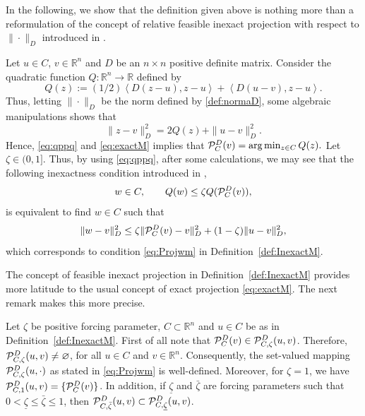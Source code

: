 In the following, we show that the definition given above is nothing more than a reformulation of the concept of  relative feasible inexact projection with respect to $\| \cdot \|_{D}$  introduced in  \cite{BirginMartinezRaydan2003}.
\begin{remark}\normalfont
	Let $u\in C$, $v\in \mathbb{R}^n$ and  $D$ be   an $n\times n$ positive definite matrix. Consider the quadratic  function $Q: \mathbb{R}^n \to \mathbb{R}$ defined by
	$$
		Q(z):=(1/2) \left\langle {D}(z-u),z-u\right\rangle +  \left \langle D(u-v), z-u \right\rangle.
	$$
	Thus,  letting  $\| \cdot \|_{D}$  be  the norm  defined by \eqref{def:normaD},  some algebraic manipulations   shows that
	\begin{equation} \label{eq:qppq}
		\|z-v\|^2_{D}= 2Q(z) +\|u-v\|^2_{D}.
	\end{equation}
	Hence,  \eqref{eq:qppq}  and \eqref{eq:exactM}  implies  that    ${\cal P}_{C}^{D}(v)=\arg \min _{z\in C}Q(z).$
	Let $\zeta\in (0, 1]$. Thus, by using \eqref{eq:qppq},  after some calculations,  we may see that  the following inexactness condition  introduced in \cite{BirginMartinezRaydan2003},
	$$
		w\in C, \qquad Q(w)\leq \zeta Q ( {\cal P}_{C}^{D}(v)) ,
	$$
	is  equivalent to find  $w\in C$ such that
	$$
		\|w-v\|_{D}^2\leq \zeta \| {\cal P}_{C}^{D}(v)-v\|_{D}^2+(1-\zeta)\|u-v\|_{D}^2,
	$$
	which corresponds to condition \eqref{eq:Projwm} in Definition~\ref{def:InexactM}.
\end{remark}\normalfont
The  concept of  feasible inexact projection  in Definition~\ref{def:InexactM}  provides  more latitude to   the usual  concept  of exact projection \eqref{eq:exactM}.  The next   remark makes  this more precise.
\begin{remark}\normalfont\label{rem: welldef}
	Let $\zeta$ be positive forcing parameter, $C\subset {\mathbb R}^n$ and $u\in C$ be as in Definition~\ref{def:InexactM}.  First of all note that  ${\cal P}_{C}^{D}( v) \in {\cal P}_{C,\zeta}^{D}(u, v)$. Therefore,  ${\cal P}_{C,\zeta}^{D}(u, v)\neq \varnothing$, for all $u\in C$ and $v\in {\mathbb R}^n$. Consequently, the set-valued mapping ${\cal P}_{C,\zeta}^{D}(u,  \cdot)$ as stated in \eqref{eq:Projwm} is well-defined.   Moreover,  for $\zeta=1$, we have ${\cal P}_{C,1}^{D}(u, v)=\{{\cal P}_{C}^{D}(v)\}$.
	In addition, if $\underline{\zeta}$ and $\bar{\zeta}$ are forcing parameters such that $0<\underline{\zeta}\leq \bar{\zeta}\leq 1$, then ${\cal P}_{C,\bar{\zeta}}^{D}(u, v) \subset {\cal P}_{C,\underline{\zeta}}^{D}(u, v)$.
\end{remark}\normalfont
